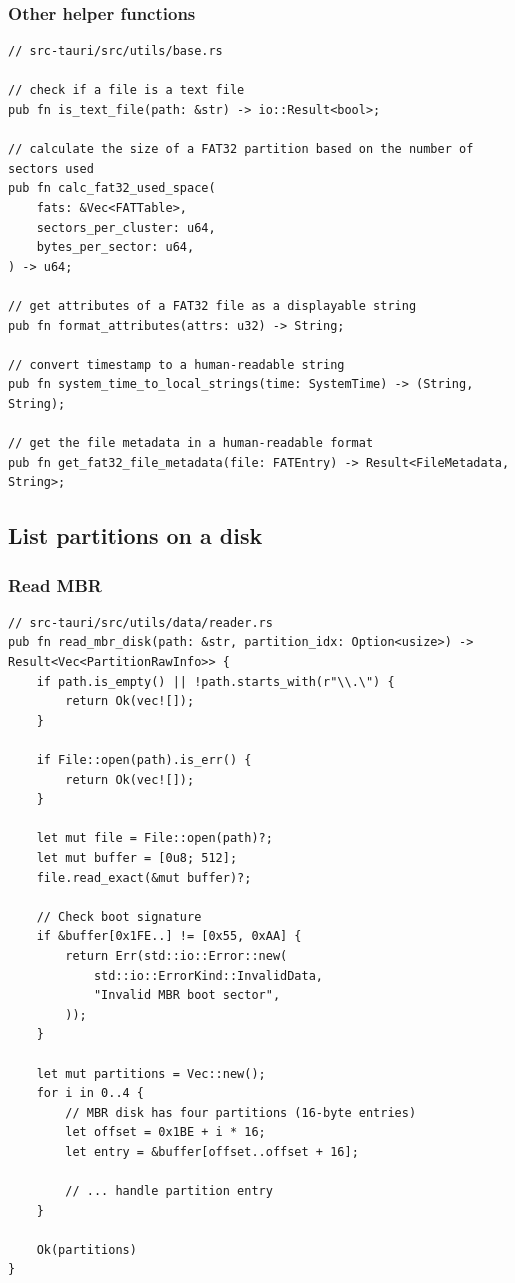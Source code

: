 \documentclass[a4paper,12pt]{report}
\begin{document}
\subsubsection*{Other helper functions}
\begin{verbatim}
// src-tauri/src/utils/base.rs

// check if a file is a text file
pub fn is_text_file(path: &str) -> io::Result<bool>;

// calculate the size of a FAT32 partition based on the number of sectors used
pub fn calc_fat32_used_space(
    fats: &Vec<FATTable>,
    sectors_per_cluster: u64,
    bytes_per_sector: u64,
) -> u64;

// get attributes of a FAT32 file as a displayable string
pub fn format_attributes(attrs: u32) -> String;

// convert timestamp to a human-readable string
pub fn system_time_to_local_strings(time: SystemTime) -> (String, String);

// get the file metadata in a human-readable format
pub fn get_fat32_file_metadata(file: FATEntry) -> Result<FileMetadata, String>;
\end{verbatim}

\subsection{List partitions on a disk}
\subsubsection*{Read MBR}
\begin{verbatim}
// src-tauri/src/utils/data/reader.rs
pub fn read_mbr_disk(path: &str, partition_idx: Option<usize>) -> Result<Vec<PartitionRawInfo>> {
    if path.is_empty() || !path.starts_with(r"\\.\") {
        return Ok(vec![]);
    }

    if File::open(path).is_err() {
        return Ok(vec![]);
    }

    let mut file = File::open(path)?;
    let mut buffer = [0u8; 512];
    file.read_exact(&mut buffer)?;

    // Check boot signature
    if &buffer[0x1FE..] != [0x55, 0xAA] {
        return Err(std::io::Error::new(
            std::io::ErrorKind::InvalidData,
            "Invalid MBR boot sector",
        ));
    }

    let mut partitions = Vec::new();
    for i in 0..4 {
        // MBR disk has four partitions (16-byte entries)
        let offset = 0x1BE + i * 16;
        let entry = &buffer[offset..offset + 16];

        // ... handle partition entry
    }

    Ok(partitions)
}
\end{verbatim}
\end{document}
